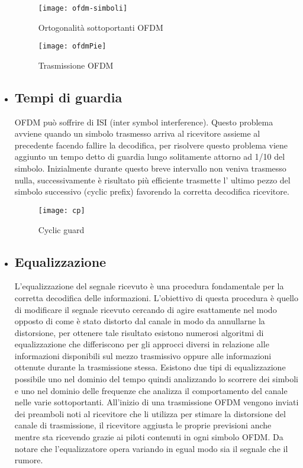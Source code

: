 \begin{itemize}
	 \begin{figure}[h]
	 	\centering
	 	\begin{minipage}[b]{.50\columnwidth}
	 		\texttt{[image: ofdm-simboli]}
	 		\caption{Ortogonalità sottoportanti OFDM \cite{ofdm-simboli}}\label{fig:1}
	 	\end{minipage}\hfill
	 	\begin{minipage}[b]{.50\columnwidth}
	 		\texttt{[image: ofdmPie]}
	 		\caption{Trasmissione OFDM }\label{fig:1}
	 	\end{minipage}\hfill
	 \end{figure}

 	 \item \subsection{Tempi di guardia } OFDM può soffrire di ISI (inter symbol interference). Questo problema avviene quando un simbolo trasmesso arriva al ricevitore assieme al precedente facendo fallire la decodifica, per risolvere questo problema viene aggiunto un tempo detto di guardia lungo solitamente attorno ad 1/10 del simbolo. Inizialmente durante questo breve intervallo non veniva trasmesso nulla, successivamente è risultato più efficiente trasmette l' ultimo pezzo del simbolo successivo (cyclic prefix) favorendo la corretta decodifica  ricevitore.
 	 \begin{figure}[h]
 	 	\centering
 	 	\texttt{[image: cp]}
 	 	\caption{Cyclic guard \cite{cp}}\label{fig:1}
 	 \end{figure}
     \item \subsection{Equalizzazione} L'equalizzazione del segnale ricevuto è una procedura fondamentale per la corretta decodifica delle informazioni. L'obiettivo di questa procedura è quello di modificare il segnale ricevuto cercando di agire esattamente nel modo opposto di come è stato distorto dal canale in modo da annullarne la distorsione, per ottenere tale risultato esistono numerosi algoritmi di equalizzazione che differiscono per gli approcci diversi in relazione alle informazioni disponibili sul mezzo trasmissivo oppure alle informazioni ottenute durante la trasmissione stessa. Esistono due tipi di equalizzazione possibile uno nel dominio del tempo quindi analizzando lo scorrere dei simboli e uno nel dominio delle frequenze che analizza il comportamento del canale nelle varie sottoportanti. All'inizio di una trasmissione OFDM vengono inviati dei preamboli noti al ricevitore che li utilizza per stimare la distorsione del canale di trasmissione, il ricevitore aggiusta le proprie previsioni anche mentre sta ricevendo grazie ai piloti contenuti in ogni simbolo OFDM. Da notare che l'equalizzatore opera variando in egual modo sia il segnale che il rumore.

\end{itemize}
